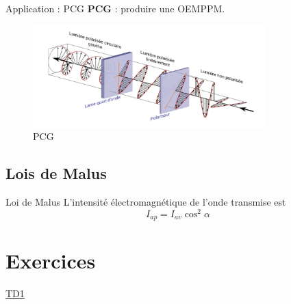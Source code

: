 \begin{Example}{Application : PCG}{}
\textbf{PCG} : produire une OEMPPM.

\begin{figure}[H] %
  \centering
  \includegraphics[width=0.8\textwidth]{./assets/PCG.jpeg}
  \caption{PCG}
  \label{fig:PCG}
\end{figure}


\end{Example}






\subsection{Lois de Malus} %
\label{sub:Lois de Malus}

\begin{Theorem}{Loi de Malus}{}
L'intensité électromagnétique de l'onde transmise est 
\begin{equation}
  I _{ap} = I _{av} \cos ^{2} \alpha
\end{equation}
\end{Theorem}



\newpage

\section{Exercices} %
\label{sec:Exercices}
\href{https://web.goodnotes.com/s/ICfkODTqFl0XfhFeQCr4Xc}{TD1}

